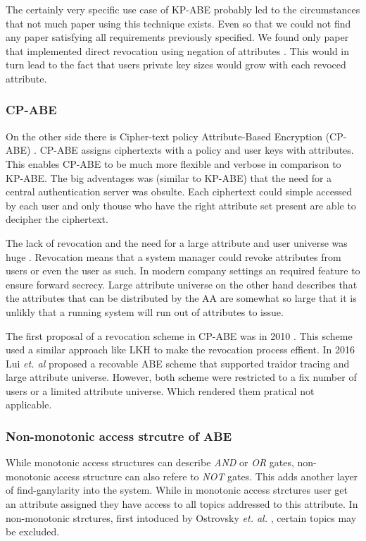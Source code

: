 The certainly very specific use case of \ac{KP-ABE} probably led to the circumstances that not much paper using this technique exists. Even so that we could not find any paper satisfying all requirements previously specified. We found only paper that implemented direct revocation using negation of attributes \cite{lewko2010revocation}. This would in turn lead to the fact that users private key sizes would grow with each revoced attribute. 

\subsubsection{\ac{CP-ABE}}
On the other side there is Cipher-text policy Attribute-Based Encryption (\ac{CP-ABE}) \cite{bethencourt2007ciphertext}. \ac{CP-ABE} assigns ciphertexts with a policy and user keys with attributes. This enables \ac{CP-ABE} to be much more flexible and verbose in comparison to \ac{KP-ABE}. The big adventages was (similar to \ac{KP-ABE}) that the need for a central authentication server was obsulte. Each ciphertext could simple accessed by each user and only thouse who have the right attribute set present are able to decipher the ciphertext. 

The lack of revocation  and the need for a large attribute and user universe was huge . Revocation means that a system manager could revoke attributes from users or even the user as such. In modern company settings an required feature to ensure forward secrecy. Large attribute universe on the other hand describes that the attributes that can be distributed by the \ac{AA} are somewhat so large that it is unlikly that a running system will run out of attributes to issue. 

The first proposal of a revocation scheme in \ac{CP-ABE} was in 2010 \cite{liang2010ciphertext}. This scheme used a similar approach like \ac{LKH} to make the revocation process effient. In 2016 Lui \textit{et. al} \cite{liu2016practical} proposed a recovable \ac{ABE} scheme that supported traidor tracing and large attribute universe. However, both scheme were restricted to a fix number of users or a limited attribute universe. Which rendered them pratical not applicable.  

\subsubsection{Non-monotonic access strcutre of \ac{ABE}}
While monotonic access structures can describe \textit{AND} or \textit{OR} gates, non-monotonic access structure can also refere to \textit{NOT} gates. This adds another layer of find-ganylarity into the system. While in monotonic access strctures user get an attribute assigned they have access to all topics addressed to this attribute. In non-monotonic strctures, first intoduced by Ostrovsky \textit{et. al.} \cite{Ostrovsky:2007:AEN:1315245.1315270}, certain topics may be excluded. 

